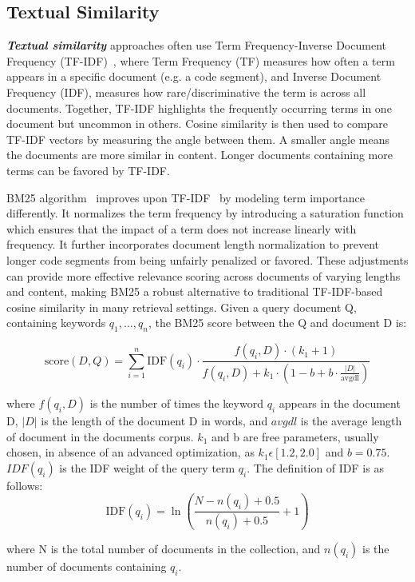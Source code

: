 \documentclass[\main/thesis.tex]{subfiles}
\begin{document}
\subsection{Textual Similarity}
\label{sec:textual-similarity}
\textbf{\textit{Textual similarity}} approaches often use Term Frequency-Inverse Document Frequency (TF-IDF)~\cite{salton1978term}, where Term Frequency (TF) measures how often a term appears in a specific document (e.g. a code segment), and Inverse Document Frequency (IDF), measures how rare/discriminative the term is across all documents. Together, TF-IDF highlights the frequently occurring terms in one document but uncommon in others. Cosine similarity is then used to compare TF-IDF vectors by measuring the angle between them. A smaller angle means the documents are more similar in content. Longer documents containing more terms can be favored by TF-IDF. 

BM25 algorithm~\cite{BM25} improves upon TF-IDF~\cite{salton1978term} by modeling term importance differently. It normalizes the term frequency by introducing a saturation function which ensures that the impact of a term does not increase linearly with frequency. It further incorporates document length normalization to prevent longer code segments from being unfairly penalized or favored. These adjustments can provide more effective relevance scoring across documents of varying lengths and content, making BM25 a robust alternative to traditional TF-IDF-based cosine similarity in many retrieval settings.
Given a query document Q, containing keywords \(q_1, \ldots, q_n\), the BM25 score between the Q and document D is:

\[
\text{score}(D,Q) =
\sum_{i=1}^{n}
\text{IDF}(q_i)\cdot
\frac{f(q_i,D)\cdot (k_1+1)}
{f(q_i,D) + k_1\cdot\left(1 - b + b\cdot\frac{|D|}{\text{avgdl}}\right)}
\]

where \(f(q_i,D)\) is the number of times the keyword \(q_{i}\) appears in the document D, \(|D|\) is the length of the document D in words, and \(avgdl\) is the average length of document in the documents corpus.  
\(k_1\) and b are free parameters, usually chosen, in absence of an advanced optimization, as 
\(k_1 \epsilon [1.2,2.0]\) and \(b=0.75\). \({IDF}(q_i)\)
is the IDF weight of the query term 
\(q_i\). The definition of IDF is as follows:
\[
\text{IDF}(q_i) = \ln\left(\frac{N - n(q_i) + 0.5}{n(q_i) + 0.5} + 1\right)
\]

where N is the total number of documents in the collection, and 
\(n(q_i)\) is the number of documents containing \(q_{i}\).
\end{document}
